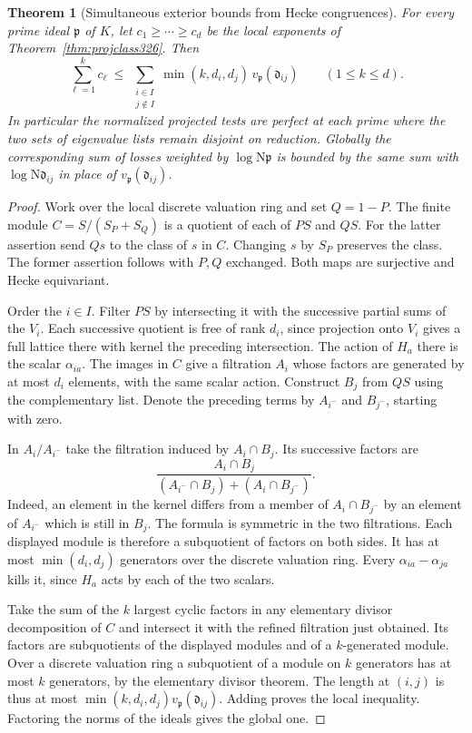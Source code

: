 \documentclass[a4paper,11pt]{article}
\newtheorem{theorem}[proposition]{Theorem}
\theoremstyle{definition}
\theoremstyle{remark}
\numberwithin{equation}{section}
\begin{document}
\begin{theorem}[Simultaneous exterior bounds from Hecke congruences]\leavevmode
\label{thm:heckeproj326}
For every prime ideal \(\mathfrak p\) of \(K\), let
\(c_1\ge\cdots\ge c_d\) be the local exponents of
Theorem~\ref{thm:projclass326}. Then
\[
   \sum_{\ell=1}^k c_\ell\ \le\
   \sum_{\substack{i\in I\\ j\notin I}}
          \min(k,d_i,d_j)\,v_{\mathfrak p}(\mathfrak d_{ij})
               \qquad (1\le k\le d).
\]
In particular the normalized projected tests are perfect
at each prime where the two sets of eigenvalue lists remain
disjoint on reduction. Globally the corresponding sum of
losses weighted by \(\log\mathrm N\mathfrak p\) is bounded
by the same sum with \(\log\mathrm N\mathfrak d_{ij}\) in
place of \(v_{\mathfrak p}(\mathfrak d_{ij})\).
\end{theorem}
\begin{proof}
Work over the local discrete valuation ring and set
\(Q=1-P\). The finite module \(C=S/(S_P+S_Q)\) is a
quotient of each of \(P S\) and \(Q S\). For the latter
assertion send \(Qs\) to the class of \(s\) in \(C\).
Changing \(s\) by \(S_P\) preserves the class. The former
assertion follows with \(P,Q\) exchanged. Both maps are
surjective and Hecke equivariant.

Order the \(i\in I\). Filter \(P S\) by intersecting it
with the successive partial sums of the \(V_i\). Each
successive quotient is free of rank \(d_i\), since projection
onto \(V_i\) gives a full lattice there with kernel the
preceding intersection. The action of \(H_a\) there is the scalar
\(\alpha_{ia}\). The images in \(C\) give a filtration
\(A_i\) whose factors are generated by at most \(d_i\)
elements, with the same scalar action. Construct \(B_j\)
from \(Q S\) using the complementary list. Denote the
preceding terms by \(A_{i^-}\) and \(B_{j^-}\), starting
with zero.

In \(A_i/A_{i^-}\) take the filtration induced by
\(A_i\cap B_j\). Its successive factors are
\[
 \frac{A_i\cap B_j}
      {(A_{i^-}\cap B_j)+(A_i\cap B_{j^-})}.
\]
Indeed, an element in the kernel differs from a member
of \(A_i\cap B_{j^-}\) by an element of \(A_{i^-}\)
which is still in \(B_j\). The formula is symmetric in
the two filtrations. Each displayed module is therefore a
subquotient of factors on both sides. It has at most
\(\min(d_i,d_j)\) generators over the discrete valuation
ring. Every \(\alpha_{ia}-\alpha_{ja}\) kills it, since
\(H_a\) acts by each of the two scalars.

Take the sum of the \(k\) largest cyclic factors in any
elementary divisor decomposition of \(C\) and intersect it
with the refined filtration just obtained. Its factors are
subquotients of the displayed modules and of a \(k\)-generated
module. Over a discrete valuation ring a subquotient of a
module on \(k\) generators has at most \(k\) generators,
by the elementary divisor theorem. The length at \((i,j)\)
is thus at most \(\min(k,d_i,d_j)v_{\mathfrak p}(\mathfrak d_{ij})\).
Adding proves the local inequality. Factoring the norms
of the ideals gives the global one.
\end{proof}
\end{document}
